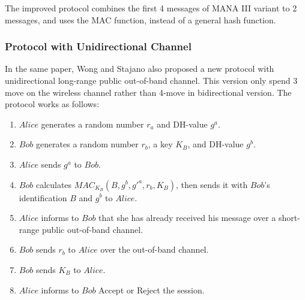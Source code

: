 The improved protocol combines the first 4 messages of MANA III variant to 2 messages, and uses the MAC function, instead of a general hash function. 
 
\subsubsection*{Protocol with Unidirectional Channel}

In the same paper, Wong and Stajano also proposed a new protocol with unidirectional long-range public out-of-band channel. This version only spend 3 move on the wireless channel rather than 4-move in bidirectional version. The protocol works as follows:
\begin{enumerate}
\item $Alice$ generates a random number $r_a$ and DH-value $g^a$.
\item $Bob$ generates a random number $r_b$, a key $K_B$, and DH-value $g^b$.
\item $Alice$ sends $g^a$ to $Bob$. 
\item $Bob$ calculates $MAC_{K_B}(B,g^b,g'^a,r_b,K_B)$, then sends it with $Bob$'s identification $B$ and $g^b$ to $Alice$.
\item $Alice$ informs to $Bob$ that she has already received his message over a short-range public out-of-band channel. 
\item $Bob$ sends $r_b$ to $Alice$ over the out-of-band channel. 
\item $Bob$ sends $K_B$ to $Alice$. 
\item $Alice$ informs to $Bob$ Accept or Reject the session.
\end{enumerate}

